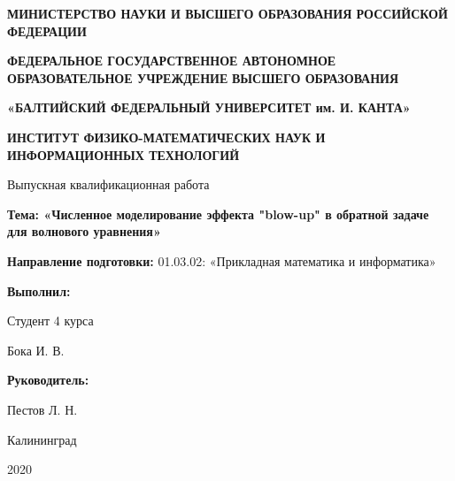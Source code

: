 \documentclass{article}
\begin{document}
\begin{titlepage}
    \begin{center}
        \textbf{МИНИСТЕРСТВО НАУКИ И ВЫСШЕГО ОБРАЗОВАНИЯ РОССИЙСКОЙ ФЕДЕРАЦИИ}

        \textbf{
            ФЕДЕРАЛЬНОЕ ГОСУДАРСТВЕННОЕ АВТОНОМНОЕ ОБРАЗОВАТЕЛЬНОЕ УЧРЕЖДЕНИЕ
        }
        \textbf{ВЫСШЕГО ОБРАЗОВАНИЯ}

        \textbf{«БАЛТИЙСКИЙ ФЕДЕРАЛЬНЫЙ УНИВЕРСИТЕТ им. И. КАНТА»}

        \textbf{
            ИНСТИТУТ ФИЗИКО-МАТЕМАТИЧЕСКИХ НАУК И ИНФОРМАЦИОННЫХ ТЕХНОЛОГИЙ
        }

        \vspace{1.5cm}
        Выпускная квалификационная работа

        \textbf{
            Тема:
            «Численное моделирование эффекта "blow-up"
            в обратной задаче для волнового уравнения»
        }

        \textbf{Направление подготовки:}
        01.03.02: «Прикладная математика и информатика»
    \begin{flushright}
        \textbf{Выполнил:}

        Студент 4 курса

        \makebox[1in]{\hrulefill} Бока И. В.

        \textbf{Руководитель:}

        \makebox[1in]{\hrulefill} Пестов Л. Н.
    \end{flushright}

        \vfill
        Калининград

        2020
    \end{center}
\end{titlepage}

\tableofcontents












\end{document}
